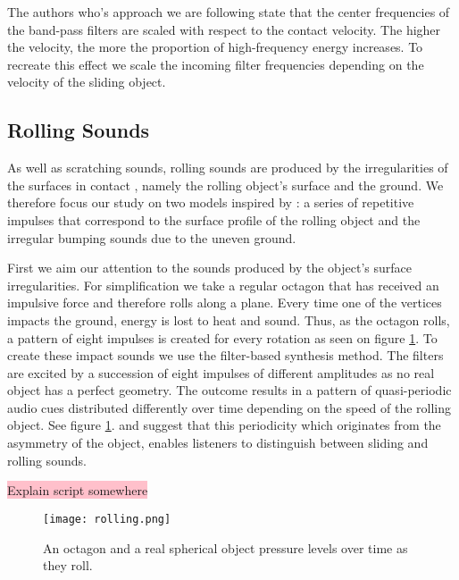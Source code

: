 The authors who's approach we are following state that the center frequencies of the band-pass filters are scaled with respect to the contact velocity. The higher the velocity, the more the proportion of high-frequency energy increases. To recreate this effect we scale the incoming filter frequencies depending on the velocity of the sliding object.

\subsection{Rolling Sounds}

As well as scratching sounds, rolling sounds are produced by the irregularities of the surfaces in contact \cite{van2001foleyautomatic}, namely the rolling object's surface and the ground. We therefore focus our study on two models inspired by \cite{farnell2010designing}: a series of repetitive impulses that correspond to the surface profile of the rolling object and the irregular bumping sounds due to the uneven ground.

First we aim our attention to the sounds produced by the object's surface irregularities. For simplification we take a regular octagon that has received an impulsive force and therefore rolls along a plane. Every time one of the vertices impacts the ground, energy is lost to heat and sound. Thus, as the octagon rolls, a pattern of eight impulses is created for every rotation as seen on figure \ref{fig:rolling}. To create these impact sounds we use the filter-based synthesis method. The filters are excited by a succession of eight impulses of different amplitudes as no real object has a perfect geometry. The outcome results in a pattern of quasi-periodic audio cues distributed differently over time depending on the speed of the rolling object. See figure \ref{fig:rolling}. \cite{houben1999auditory} and \cite{rath2003expressive} suggest that this periodicity which originates from the asymmetry of the object, enables listeners to distinguish between sliding and rolling sounds.

\colorbox{pink}{Explain script somewhere}

\begin{figure}[H]
  \centering
    \texttt{[image: rolling.png]}
      \caption{An octagon and a real spherical object pressure levels over time as they roll.}
      \label{fig:rolling}
\end{figure} 

